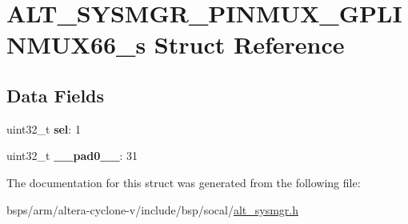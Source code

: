 \hypertarget{structALT__SYSMGR__PINMUX__GPLINMUX66__s}{}\section{A\+L\+T\+\_\+\+S\+Y\+S\+M\+G\+R\+\_\+\+P\+I\+N\+M\+U\+X\+\_\+\+G\+P\+L\+I\+N\+M\+U\+X66\+\_\+s Struct Reference}
\label{structALT__SYSMGR__PINMUX__GPLINMUX66__s}
\subsection*{Data Fields}
\begin{DoxyCompactItemize}
\item 
\mbox{\label{structALT__SYSMGR__PINMUX__GPLINMUX66__s_aacc60be8d55ed48537febab73ee776db}} 
uint32\+\_\+t {\bfseries sel}\+: 1
\item 
\mbox{\label{structALT__SYSMGR__PINMUX__GPLINMUX66__s_a9e3e99d6dcb8aaf94a7d818cf3e5d6c0}} 
uint32\+\_\+t {\bfseries \+\_\+\+\_\+pad0\+\_\+\+\_\+}\+: 31
\end{DoxyCompactItemize}


The documentation for this struct was generated from the following file\+:\begin{DoxyCompactItemize}
\item 
bsps/arm/altera-\/cyclone-\/v/include/bsp/socal/\mbox{\hyperlink{alt__sysmgr_8h}{alt\+\_\+sysmgr.\+h}}\end{DoxyCompactItemize}
